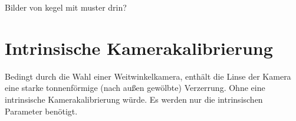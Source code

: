 

Bilder von kegel mit muster drin?

\section{Intrinsische Kamerakalibrierung}

Bedingt durch die Wahl einer Weitwinkelkamera, enthält die Linse der Kamera eine starke tonnenförmige (nach außen gewölbte) Verzerrung. Ohne eine intrinsische Kamerakalibrierung würde. Es werden nur die intrinsischen Parameter benötigt. 


